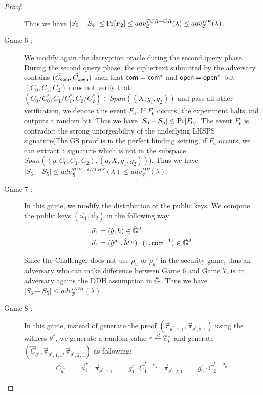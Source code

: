 \begin{proof}
\begin{description}
    Thus we have $|S_5 - S_4| \leq \operatorname{Pr}[F_2] \leq adv_{\mathcal{B}}^{TCR-CR}(\lambda) \leq adv_{\mathcal{B}}^{DP}(\lambda)$. 

  \item[\textsf{Game} $6$ :] We modify again the decryption oracle during the second query phase. During the second query phase, the ciphertext submitted by the adversary contains $(\vec{C}_{\mathsf{com}}, \vec{C}_{\mathsf{open}})$ such that $\mathsf{com} = \mathsf{com}^*$ and $\mathsf{open} = \mathsf{open}^*$ but $(C_0, C_1, C_2)$ does not verify that $(C_0/ C_0^*, C_1/C_1^*, C_2/C_2^*) \in Span((X, g_1, g_2))$ and pass all other verification, we denote this event $F_6$. If $F_6$ occurs, the experiment halts and outputs a random bit. Thus we have $|S_6 - S_5| \leq \operatorname{Pr}[F_6]$. The event $F_6$ is contradict the strong unforgeability of the underlying LHSPS signature(The GS proof is in the perfect binding setting, if $F_6$ occurs, we can extract a signature which is not in the subspace $Span((g, C_0, C_1, C_2), (a, X, g_1, g_2))$). Thus we have $|S_6 - S_5| \leq adv_{\mathcal{B}}^{SUF-OTLHS}(\lambda) \leq adv_{\mathcal{B}}^{DP}(\lambda)$.
    
    
  \item[\textsf{Game} $7$ :] In this game, we modify the distribution of the public keys. We compute the public keys $(\vec{u}_1, \vec{u}_2)$ in the following way:
    \begin{align*}
      \vec{u}_1 &= (\hat{g}, \hat{h}) \in \hat{\mathbb{G}}^2\\
      \vec{u}_1 &= (\hat{g}^{\rho_u}, \hat{h}^{\rho_u}) \cdot (1, \mathsf{com}^{-1}) \in \hat{\mathbb{G}}^2
    \end{align*}

    Since the Challenger does not use $\rho_u$ or $\rho_u'$ in the security game, thus an adversary who can make difference between \textsf{Game} $6$ and \textsf{Game} $7$, is an adversary agains the DDH assumption in $\hat{\mathbb{G}}$. Thus we have $|S_6 - S_5| \leq adv_{\mathcal{B}}^{DDH}(\lambda)$.

  \item[\textsf{Game} $8$ :] In this game, instead of generate the proof $(\vec{\pi}_{\theta^*, 1, 1}, \vec{\pi}_{\theta^*, 2, 1})$ using the witness $\theta^*$, we generate a random value $r \stackrel{{\scriptscriptstyle \mkern4mu R}}{\gets} \mathbb{Z}_p^*$ and generate $(\vec{C}_{\theta^*}, \vec{\pi}_{\theta^*,1,1}, \vec{\pi}_{\theta^*,2,1})$ as following:
    \begin{align*}
      \vec{C}_{\theta^*} &= \vec{u}_1^r & \vec{\pi}_{\theta^*,1,1} &= g_1^r \cdot C_1^{*-\rho_u} & \vec{\pi}_{\theta^*,2,1} &= g_2^r \cdot C_2^{*-\rho_u}
    \end{align*}


\end{description}
\end{proof}
